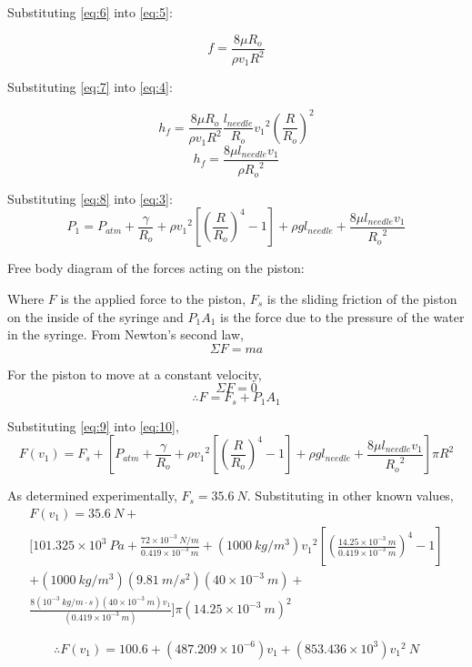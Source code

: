 \documentclass{article}
\begin{document}
Substituting \eqref{eq:6} into \eqref{eq:5}:

\[ f = \frac{8 \mu R_{o}}{\rho v_{1} R^{2}} \tag{7} \label{eq:7} \]

Substituting \eqref{eq:7} into \eqref{eq:4}:

\[ h_{f} = \frac{8 \mu R_{o}}{\rho v_{1} R^{2}} \frac{l_{needle}}{R_{o}} {v_{1}}^2 \left(\frac{R}{R_{o}}\right)^2 \]
\[ h_{f} = \frac{8 \mu l_{needle} v_{1} }{\rho {R_{o}}^2} \tag{8} \label{eq:8} \]

Substituting \eqref{eq:8} into \eqref{eq:3}:
\[ P_{1} = P_{atm} + \frac{\gamma}{R_{o}} + \rho{v_{1}}^2\left[\left(\frac{R}{R_{o}}\right)^4  - 1 \right] + \rho gl_{needle} + \frac{8 \mu l_{needle} v_{1} }{{R_{o}}^2} \tag{9} \label{eq:9} \]

Free body diagram of the forces acting on the piston:

Where $F$ is the applied force to the piston, $F_{s}$ is the sliding friction of the piston on the inside of the syringe and $P_{1}A_{1}$ is the force due to the pressure of the water in the syringe. From Newton's second law,
\[ \Sigma F = ma \]

For the piston to move at a constant velocity,
\[ \Sigma F = 0 \]
\[ \therefore F = F_{s} + P_{1}A_{1} \tag{10} \label{eq:10} \]

Substituting \eqref{eq:9} into \eqref{eq:10},
\[ F(v_{1}) = F_{s} + \left[P_{atm} + \frac{\gamma}{R_{o}} + \rho{v_{1}}^2\left[\left(\frac{R}{R_{o}}\right)^4  - 1 \right] + \rho gl_{needle} + \frac{8 \mu l_{needle} v_{1} }{{R_{o}}^2} \right] \pi R^{2}\]

As determined experimentally, $F_{s} = 35.6 \ N$. Substituting in other known values,
\begin{multline*}
F(v_{1}) = 35.6 \ N + \\ \bigg[ 101.325 \times 10^{3} \ Pa + \frac{72 \times 10^{-3} \ N/m}{0.419 \times 10^{-3} \ m} +\left(1000 \ kg/m^3 \right) {v_{1}}^2 \left[\left(\frac{14.25 \times 10^{-3} \ m}{0.419 \times 10^{-3} \ m}\right)^4  - 1 \right] \\ + \left(1000 \ kg/m^3 \right) \left( 9.81 \ m/s^2 \right) \left( 40 \times 10^{-3} \ m \right) + \\ \frac{8 \left( 10^{-3} \ kg/m \cdot s \right) \left( 40 \times 10^{-3} \ m \right) v_{1}}{\left( 0.419 \times 10^{-3} \ m \right)} \bigg] \pi {\left( 14.25 \times 10^{-3} \ m \right)}^{2}
\end{multline*}

\[ \therefore F(v_{1}) = 100.6 + (487.209 \times 10^{-6}) v_{1} + (853.436 \times 10^{3}) {v_{1}}^2 \ N \]
\end{document}
